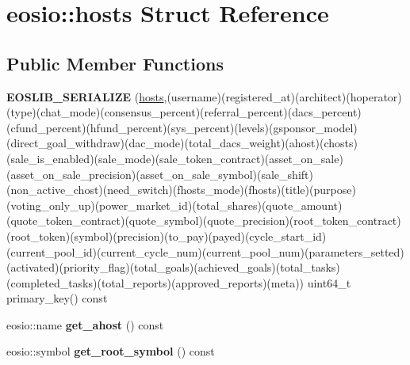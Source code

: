 \hypertarget{structeosio_1_1hosts}{}\section{eosio\+:\+:hosts Struct Reference}
\label{structeosio_1_1hosts}
\subsection*{Public Member Functions}
\begin{DoxyCompactItemize}
\item 
\mbox{\label{structeosio_1_1hosts_a16c87ca5c7fc1541e2b26c50f3081c7b}} 
{\bfseries E\+O\+S\+L\+I\+B\+\_\+\+S\+E\+R\+I\+A\+L\+I\+ZE} (\mbox{\hyperlink{structeosio_1_1hosts}{hosts}},(username)(registered\+\_\+at)(architect)(hoperator)(type)(chat\+\_\+mode)(consensus\+\_\+percent)(referral\+\_\+percent)(dacs\+\_\+percent)(cfund\+\_\+percent)(hfund\+\_\+percent)(sys\+\_\+percent)(levels)(gsponsor\+\_\+model)(direct\+\_\+goal\+\_\+withdraw)(dac\+\_\+mode)(total\+\_\+dacs\+\_\+weight)(ahost)(chosts)(sale\+\_\+is\+\_\+enabled)(sale\+\_\+mode)(sale\+\_\+token\+\_\+contract)(asset\+\_\+on\+\_\+sale)(asset\+\_\+on\+\_\+sale\+\_\+precision)(asset\+\_\+on\+\_\+sale\+\_\+symbol)(sale\+\_\+shift)(non\+\_\+active\+\_\+chost)(need\+\_\+switch)(fhosts\+\_\+mode)(fhosts)(title)(purpose)(voting\+\_\+only\+\_\+up)(power\+\_\+market\+\_\+id)(total\+\_\+shares)(quote\+\_\+amount)(quote\+\_\+token\+\_\+contract)(quote\+\_\+symbol)(quote\+\_\+precision)(root\+\_\+token\+\_\+contract)(root\+\_\+token)(symbol)(precision)(to\+\_\+pay)(payed)(cycle\+\_\+start\+\_\+id)(current\+\_\+pool\+\_\+id)(current\+\_\+cycle\+\_\+num)(current\+\_\+pool\+\_\+num)(parameters\+\_\+setted)(activated)(priority\+\_\+flag)(total\+\_\+goals)(achieved\+\_\+goals)(total\+\_\+tasks)(completed\+\_\+tasks)(total\+\_\+reports)(approved\+\_\+reports)(meta)) uint64\+\_\+t primary\+\_\+key() const
\item 
\mbox{\label{structeosio_1_1hosts_a46de7eb626c02fdd20a51da16c61d027}} 
eosio\+::name {\bfseries get\+\_\+ahost} () const
\item 
\mbox{\label{structeosio_1_1hosts_a3d674759c286e4f2d669f57abbf03ff3}} 
eosio\+::symbol {\bfseries get\+\_\+root\+\_\+symbol} () const
\end{DoxyCompactItemize}
